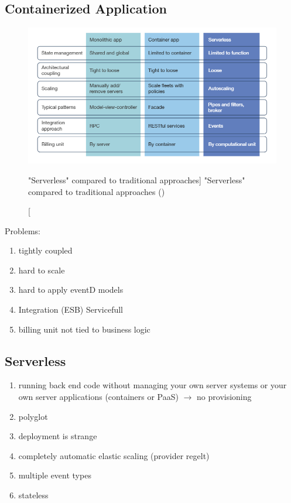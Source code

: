 \subsection{Containerized Application}

\begin{figure}[ht]
    \includegraphics[width=\linewidth]{images/serverless/demyst.png}\centering
    \caption
    ["Serverless" compared to traditional approaches]
    {"Serverless" compared to traditional approaches (\cite{Hammond2018DemystifyingComputing})}
    \label{fig:slessCompared}
\end{figure}

Problems:
\begin{enumerate}
    \item tightly coupled
    \item hard to scale
    \item hard to apply eventD models
    \item Integration (ESB)  Servicefull
    \item billing unit not tied to business logic
\end{enumerate}


\subsection{Serverless}\label{sec:serverless}


\begin{enumerate}\label{lst:serverlessCharacteristics}
    \item running back end code without managing your own server systems or your own server applications (containers or PaaS) $\longrightarrow$ no provisioning
    \item polyglot
    \item deployment is strange 
    \item completely automatic elastic scaling (provider regelt)
    \item multiple event types
    \item stateless
\end{enumerate}
\autocite{Roberts2016ServerlessArchitectures}

